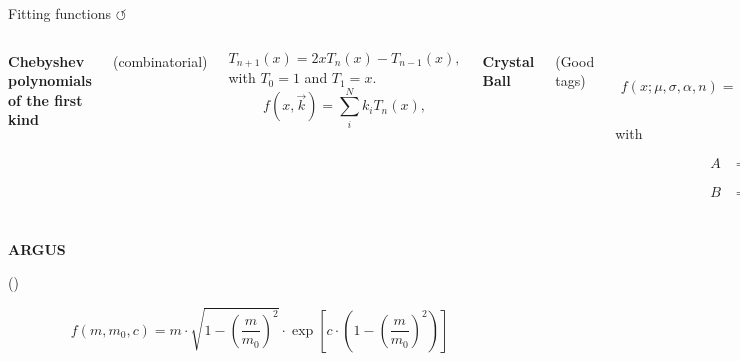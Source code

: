 \documentclass[xcolor=dvipsnames]{beamer}
\begin{document}
\begin{frame}{Fitting functions \hyperlink{frame:A}{$\circlearrowleft$}}

   \centering\scriptsize

\begin{columns}
   \centering
   \textbf{Chebyshev polynomials of the first kind} 
   
   (\BB combinatorial)

   \vspace{-10pt}

\begin{equation*}\label{eq:chebyshev_generator}
   T_{n+1}(x) = 2xT_n(x) - T_{n-1}(x),
\end{equation*}
with $T_0=1$ and $T_1=x$.
\begin{equation*}\label{eq:chebyshev_pdf}
   f(x, \vec{k}) = \sum_i^N k_i T_n(x),
\end{equation*}

\centering
\textbf{Crystal Ball} 

(Good tags)

\vspace{-10pt}

\begin{align*}\label{eq:crystal_ball}
   f(x;\mu, \sigma, \alpha, n) =  
   \begin{cases} 
   \exp(- \frac{(x - \mu)^2}{2 \sigma^2}), & \mbox{for}\frac{x - \mu}{\sigma} \geqslant -\alpha \\
   A \cdot (B - \frac{x - \mu}{\sigma})^{-n}, & \mbox{for }\frac{x - \mu}{\sigma} < -\alpha 
   \end{cases}
\end{align*}
with
\begin{align*}
   \begin{split}
   A &= \left(\frac{n}{\left| \alpha \right|}\right)^n \cdot \exp\left(- \frac {\left|\alpha \right|^2}{2}\right)\\
   B   &= \frac{n}{\left| \alpha \right|}  - \left| \alpha \right|.
   \end{split}
\end{align*}

\end{columns}


  \textbf{ARGUS} 
  
  (\qqbar)

  \vspace{-10pt}

  \begin{equation*}\label{eq:argus_function}
   f(m, m_0, c) = m \cdot \sqrt{ 1 - \left( \frac{m}{m_0} \right)^2}
   \cdot \exp\left[ c \cdot \left(1 - \left(\frac{m}{m_0}\right)^2 \right) \right]
\end{equation*}


\end{frame}
\end{document}
